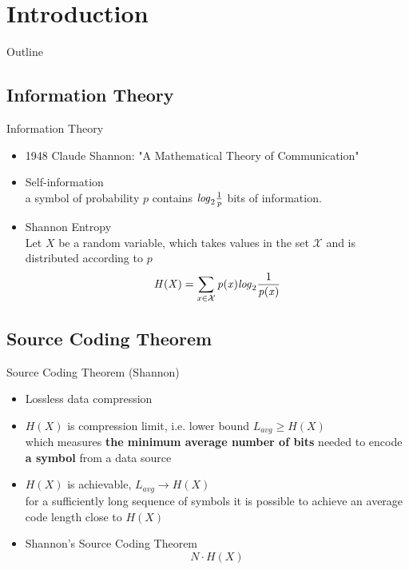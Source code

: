 \section[Intro]{Introduction}

\begin{frame}{Outline}
    \tableofcontents[currentsection, sectionstyle=show/hide, subsectionstyle=show/show/hide, subsubsectionstyle=hide/hide/hide]
\end{frame}


\subsection{Information Theory}
\begin{frame}[fragile]{Information Theory}
    \begin{itemize}
        \item 1948 Claude Shannon: "A Mathematical Theory of Communication"
        \item Self-information \\ a symbol of probability $\mathit{p}$ contains $\mathit{log}_2{1\over \mathit{p}}$ bits of information.
        \item Shannon Entropy \\Let $\mathit{X}$ be a random variable, which takes values in the set $\mathcal{X}$ and is distributed according to $\mathit{p}$ \\ $$\mathit{H(X) = \sum_{x \in \mathcal{X}} p(x)} \mathit{log}_2 {1\over{\mathit{p(x)}}}$$ 
    \end{itemize}
\end{frame}

\subsection{Source Coding Theorem}
\begin{frame}[fragile]{Source Coding Theorem (Shannon) }
    \begin{itemize}
        \item Lossless data compression
        \item $\mathit{H(X)}$ is compression limit, i.e. lower bound $\mathit{L_{\text{avg}} \geq H(X)}$ \\ 
        which measures \textbf{the minimum average number of bits} needed to encode \textbf{a symbol} from a data source
        \item $\mathit{H(X)}$ is achievable, $\mathit{L_{\text{avg}} \rightarrow H(X)}$ \\
        for a sufficiently long sequence of symbols it is possible to achieve an average code length close to $\mathit{H(X)}$
        \item Shannon's Source Coding Theorem  $$\mathit{N \cdot H(X)}$$
    \end{itemize}
\end{frame}

